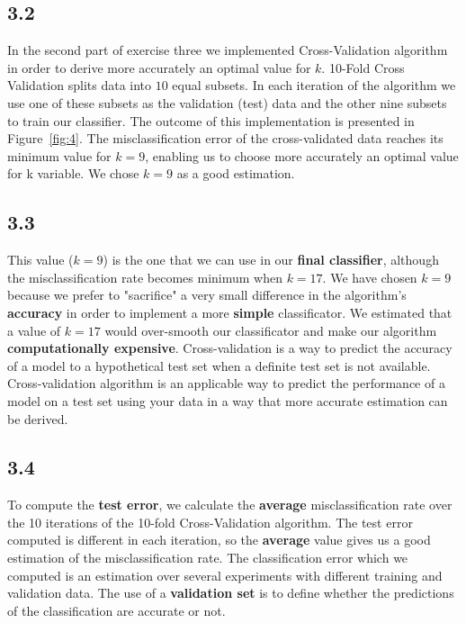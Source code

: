 \documentclass[letterpaper,11pt]{article}
\begin{document}
\subsection*{3.2}
In the second part of exercise three we implemented Cross-Validation algorithm in order to derive more accurately an optimal value for $k$. 10-Fold Cross Validation splits data into $10$ equal subsets. In each iteration of the algorithm we use one of these subsets as the validation (test) data and the other nine subsets to train our classifier. The outcome of this implementation is presented in Figure~\ref{fig:4}. The misclassification error of the cross-validated data reaches its minimum value for $k=9$, enabling us to choose more accurately an optimal value for k variable. We chose $k=9$ as a good estimation. 


\subsection*{3.3}
This value ($k=9$) is the one that we can use in our \textbf{final classifier}, although the misclassification rate becomes minimum when $k=17$. We have chosen $k=9$ because we prefer to "sacrifice" a very small difference in the algorithm's \textbf{accuracy} in order to implement a more \textbf{simple} classificator. We estimated that a value of $k=17$ would over-smooth our classificator and make our algorithm \textbf{computationally expensive}. Cross-validation is a way to predict the accuracy of a model to a hypothetical test set when a definite test set is not available. Cross-validation algorithm is an applicable way to predict the performance of a model on a test set using your data in a way that more accurate estimation can be derived. 

\subsection*{3.4}
To compute the \textbf{test error}, we calculate the \textbf{average} misclassification rate over the 10 iterations of the 10-fold Cross-Validation algorithm. The test error computed is different in each iteration, so the \textbf{average} value gives us a good estimation of the misclassification rate. The classification error which we computed is an estimation over several experiments with different training and validation data. The use of a \textbf{validation set} is to define whether the predictions of the classification are accurate or not.
\end{document}
